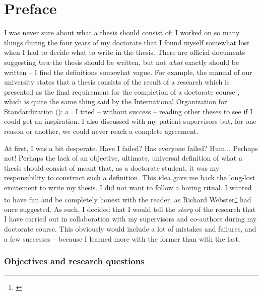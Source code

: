 \chapter*{Preface}

I was never sure about what a thesis should consist of: I worked on so many things during the four years of 
my doctorate that I found myself somewhat lost when I had to decide what to write in the thesis. There are 
official documents suggesting \emph{how} the thesis should be written, but not \emph{what} exactly should be 
written -- I find the definitions somewhat vague. For example, the manual of our university states that a 
thesis consists of the result of a research which is presented as the final requirement for the completion of a 
doctorate course \cite{UFRRJ2006}, which is quite the same thing said by the International Organization for 
Standardization (\iso): a  \cite{ISO1986}. I tried -- without 
success -- reading other theses to see if I could get an inspiration. I also discussed with my patient 
supervisors but, for one reason or another, we could never reach a complete agreement.

At first, I was a bit desperate. Have I failed? Has everyone failed? Hum... Perhaps not! Perhaps the lack of 
an objective, ultimate, universal definition of what a thesis should consist of meant that, as a doctorate 
student, it was my responsibility to construct such a definition. This idea gave me back the long-lost 
excitement to write my thesis. I did not want to follow a boring ritual. I wanted to have fun and be 
completely honest with the reader, as Richard Webster\footnote{\cite{Webster2003}} had once suggested. As 
such, I decided that I would tell the \emph{story} of the research that I have carried out in collaboration 
with my supervisors and co-authors during my doctorate course. This obviously would include a lot of mistakes 
and failures, and a few successes -- because I learned more with the former than with the last.

\subsection{Objectives and research questions}

